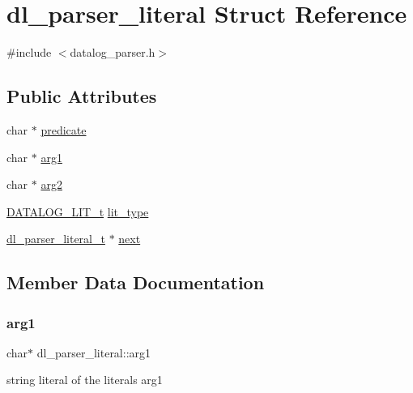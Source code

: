 \hypertarget{structdl__parser__literal}{}\section{dl\+\_\+parser\+\_\+literal Struct Reference}
\label{structdl__parser__literal}


{\ttfamily \#include $<$datalog\+\_\+parser.\+h$>$}

\subsection*{Public Attributes}
\begin{DoxyCompactItemize}
\item 
char $\ast$ \hyperlink{structdl__parser__literal_a29b6704d93332f103bd46525b651c62e}{predicate}
\item 
char $\ast$ \hyperlink{structdl__parser__literal_a13d39bca7ac508dbade23c5068d02a17}{arg1}
\item 
char $\ast$ \hyperlink{structdl__parser__literal_a069378d1cdd069e6e3131c25c6f6fe40}{arg2}
\item 
\hyperlink{datalog__api_8h_ad27ac7b01e9690a8c6d1bd37e131a421}{D\+A\+T\+A\+L\+O\+G\+\_\+\+L\+I\+T\+\_\+t} \hyperlink{structdl__parser__literal_a8e4ab2c8fdcdf404c30069f9abd12544}{lit\+\_\+type}
\item 
\hyperlink{datalog__parser_8h_adaef2eede58b9f7698925f7194af1373}{dl\+\_\+parser\+\_\+literal\+\_\+t} $\ast$ \hyperlink{structdl__parser__literal_af1e52e4932e62608901b911045b566b7}{next}
\end{DoxyCompactItemize}


\subsection{Member Data Documentation}
\mbox{\label{structdl__parser__literal_a13d39bca7ac508dbade23c5068d02a17}} 
\subsubsection{\texorpdfstring{arg1}{arg1}}
{\footnotesize\ttfamily char$\ast$ dl\+\_\+parser\+\_\+literal\+::arg1}

string literal of the literal\textquotesingle{}s arg1 \mbox{\label{structdl__parser__literal_a069378d1cdd069e6e3131c25c6f6fe40}} 
